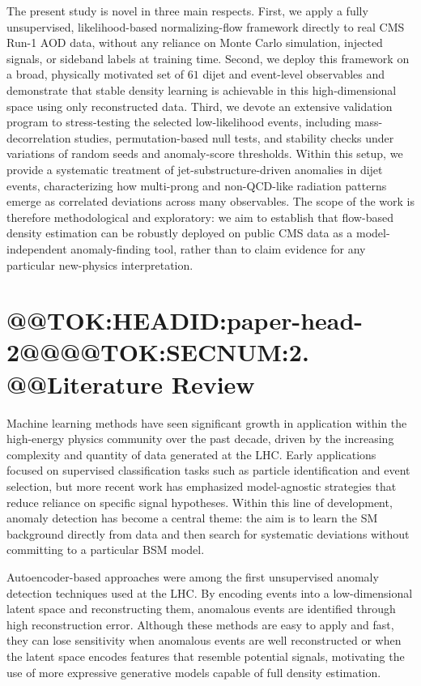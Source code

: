 \documentclass[11pt]{article}
\begin{document}
The present study is novel in three main respects. First, we apply a fully unsupervised, likelihood-based normalizing-flow framework directly to real CMS Run-1 AOD data, without any reliance on Monte Carlo simulation, injected signals, or sideband labels at training time. Second, we deploy this framework on a broad, physically motivated set of $61$ dijet and event-level observables and demonstrate that stable density learning is achievable in this high-dimensional space using only reconstructed data. Third, we devote an extensive validation program to stress-testing the selected low-likelihood events, including mass-decorrelation studies, permutation-based null tests, and stability checks under variations of random seeds and anomaly-score thresholds. Within this setup, we provide a systematic treatment of jet-substructure-driven anomalies in dijet events, characterizing how multi-prong and non-QCD-like radiation patterns emerge as correlated deviations across many observables. The scope of the work is therefore methodological and exploratory: we aim to establish that flow-based density estimation can be robustly deployed on public CMS data as a model-independent anomaly-finding tool, rather than to claim evidence for any particular new-physics interpretation.

\section{@@TOK:HEADID:paper-head-2@@@@TOK:SECNUM:2. @@Literature Review}

Machine learning methods have seen significant growth in application within the high-energy physics community over the past decade, driven by the increasing complexity and quantity of data generated at the LHC. Early applications focused on supervised classification tasks such as particle identification and event selection, but more recent work has emphasized model-agnostic strategies that reduce reliance on specific signal hypotheses. Within this line of development, anomaly detection has become a central theme: the aim is to learn the SM background directly from data and then search for systematic deviations without committing to a particular BSM model.

Autoencoder-based approaches were among the first unsupervised anomaly detection techniques used at the LHC. By encoding events into a low-dimensional latent space and reconstructing them, anomalous events are identified through high reconstruction error. Although these methods are easy to apply and fast, they can lose sensitivity when anomalous events are well reconstructed or when the latent space encodes features that resemble potential signals, motivating the use of more expressive generative models capable of full density estimation.
\end{document}

